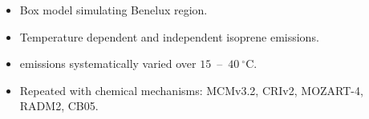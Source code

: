 \begin{BlueBox}
    \vskip-1cm
    \begin{block}{}
        \begin{itemize} 
            \item Box model simulating Benelux region. \vspace{10mm}
            \item Temperature dependent and independent isoprene emissions. \vspace{10mm}
            \item {} emissions systematically varied over \mbox{$15$ -- $40~^{\circ}$C}. \vspace{10mm}
            \item Repeated with chemical mechanisms: MCMv3.2, CRIv2, MOZART-4, \\ RADM2, CB05. \vspace{10mm}
        \end{itemize}
    \end{block}
\end{BlueBox}
